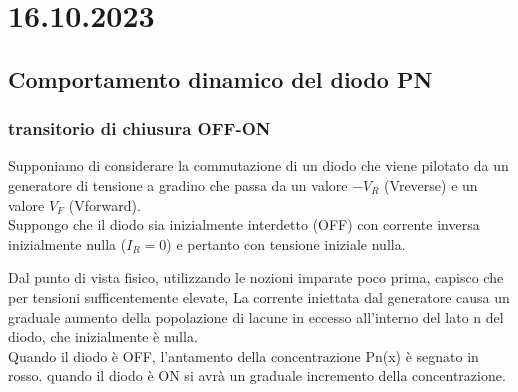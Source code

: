 \section*{16.10.2023}

\subsection{Comportamento dinamico del diodo PN}
%
\subsubsection{transitorio di chiusura OFF-ON}
Supponiamo di considerare la commutazione di un diodo che viene pilotato da un generatore di tensione a gradino che passa da un valore $-V_R$ (Vreverse) e un valore $V_F$ (Vforward).\\
Suppongo che il diodo sia inizialmente interdetto (OFF) con corrente inversa inizialmente nulla ($I_R=0$) e pertanto con tensione iniziale nulla. 

Dal punto di vista fisico, utilizzando le nozioni imparate poco prima, capisco che per tensioni sufficentemente elevate, La corrente iniettata dal generatore causa un graduale aumento della popolazione di lacune in eccesso all'interno del lato n del diodo, che inizialmente è nulla.\\
Quando il diodo è OFF, l'antamento della concentrazione Pn(x) è segnato in rosso. quando il diodo è ON si avrà un graduale incremento della concentrazione.\\

